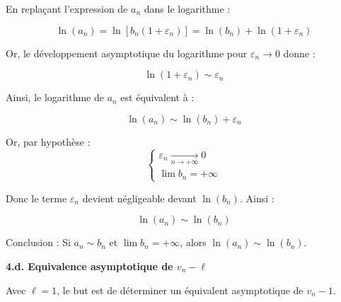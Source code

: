 \documentclass[10pt,a4paper]{article}
\begin{document}
\medskip
En replaçant l'expression de \( a_n \) dans le logarithme :

\[
    \ln(a_n) = \ln \left[b_n (1 + \varepsilon_n)\right]
             = \ln(b_n) + \ln(1 + \varepsilon_n)
\]

Or, le développement asymptotique du logarithme pour \( \varepsilon_n \to 0 \) donne :

\[
    \ln(1 + \varepsilon_n) \sim \varepsilon_n
\]

Ainsi, le logarithme de \( a_n \) est équivalent à :

\[
    \ln(a_n) \sim \ln(b_n) + \varepsilon_n
\]

Or, par hypothèse :
\[
\begin{cases}
    \varepsilon_n \underset{n \to +\infty}{\longrightarrow} 0 \\
    \lim b_n = +\infty
\end{cases}
\]

Donc le terme \( \varepsilon_n \) devient négligeable devant \( \ln(b_n) \). Ainsi :

\[
    \ln(a_n) \sim \ln(b_n)
\]

Conclusion :
Si \( a_n \sim b_n \) et \( \lim b_n = +\infty \), alors \( \ln(a_n) \sim \ln(b_n) \).

\bigskip
\textbf{4.d. Equivalence asymptotique de \( v_n - \ell \)}


Avec \( \ell = 1 \), le but est de déterminer un équivalent asymptotique de \( v_n - 1 \).
\end{document}
